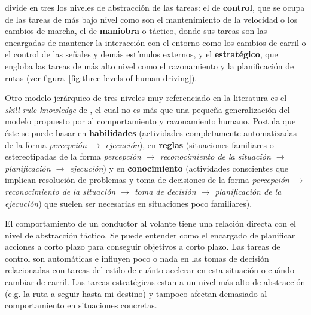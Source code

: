 \cite{michon1985critical} divide en tres los niveles de abstracción de las tareas: el de \textbf{control}, que se ocupa de las tareas de más bajo nivel como son el mantenimiento de la velocidad o los cambios de marcha, el de \textbf{maniobra} o táctico, donde sus tareas son las encargadas de mantener la interacción con el entorno como los cambios de carril o el control de las señales y demás estímulos externos, y el \textbf{estratégico}, que engloba las tareas de más alto nivel como el razonamiento y la planificación de rutas (ver figura~\ref{fig:three-levels-of-human-driving}).

Otro modelo jerárquico de tres niveles muy referenciado en la literatura es el \textit{skill-rule-knowledge} de \cite{Rasmussen1986}, el cual no es más que una pequeña generalización del modelo propuesto por \cite{michon1985critical} al comportamiento y razonamiento humano. Postula que éste se puede basar en \textbf{habilidades} (actividades completamente automatizadas de la forma \textit{percepción $\rightarrow$ ejecución}), en \textbf{reglas} (situaciones familiares o estereotipadas de la forma \textit{percepción $\rightarrow$ reconocimiento de la situación $\rightarrow$ planificación $\rightarrow$ ejecución}) y en \textbf{conocimiento} (actividades conscientes que implican resolución de problemas y toma de decisiones de la forma \textit{percepción $\rightarrow$ reconocimiento de la situación $\rightarrow$ toma de decisión $\rightarrow$ planificación de la ejecución}) que suelen ser necesarias en situaciones poco familiares).

El comportamiento de un conductor al volante tiene una relación directa con el nivel de abstracción táctico. Se puede entender como el encargado de planificar acciones a corto plazo para conseguir objetivos a corto plazo. Las tareas de control son automáticas e influyen poco o nada en las tomas de decisión relacionadas con tareas del estilo de cuánto acelerar en esta situación o cuándo cambiar de carril. Las tareas estratégicas estan a un nivel más alto de abstracción (e.g. la ruta a seguir hasta mi destino) y tampoco afectan demasiado al comportamiento en situaciones concretas.

